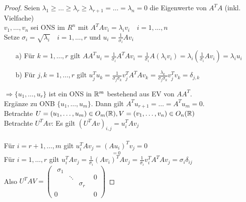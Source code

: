 \begin{proof}
	Seien $\lambda_1 \ge \ldots \ge \lambda_r\ge\lambda_{r+1}=\ldots=\lambda_n=0$ die Eigenwerte von $A^TA$ (inkl. Vielfache)\\
	$v_1,\ldots,v_n$ sei ONS im $R^n$ mit $A^TAv_i=\lambda_iv_i \quad i=1,\ldots,n$\\
	Setze $\sigma_i =\sqrt{\lambda_i} \quad i=1,\ldots,r \text{ und } u_i=\frac{1}{\sigma_i}Av_i$\\
	\begin{itemize}
		\item[a)]Für $k=1,\ldots,r$ gilt $AA^Tu_i=\frac{1}{\sigma_i}A^TAv_i=\frac{1}{\sigma_i}A(\lambda_iv_i)=\lambda_i\left(\frac{1}{\sigma_i}Av_i\right)=\lambda_iu_i$
		\item[b)]Für $j,k=1,\ldots,r$ gilt $u_j^{T}u_k=\frac{1}{\sigma_j\sigma_k}v_j^{T}A^TAv_k=\frac{\lambda_k}{\sigma_j\sigma_k}v_j^{T}v_k=\delta_{j,k}$
	\end{itemize}
	$\Rightarrow \{u_1,\ldots,u_r\}$ ist ein ONS in $\mathbb R^m$ bestehend aus EV von $AA^T$.\\\newline
	Ergänze zu ONB $\{u_1,\ldots,u_m\}$. Dann gilt $A^Tu_{r+1}=\ldots=A^Tu_m=0$.\\
	Betrachte $U=(u_1,\ldots,u_m) \in O_m(\mathbb R), V=(v_1,\ldots,v_n) \in O_n(\mathbb R)$\\
	Betrachte $U^TAv$: Es gilt $(U^TAv)_{i,j}=u_i^{T}Av_j$\\\\
	Für $i=r+1,\ldots,m$ gilt $u_i^{T}Av_j=\underset{=0}{(Au_i)^T}v_j=0$\\
	Für $i=1,\ldots,r $ gilt $u_i^{T}Av_j=\frac{1}{\sigma_i}(Av_i)^TAv_j=\frac{1}{\sigma_i}v_i^{T}A^TAv_j=\sigma_i\delta_{ij}$\\\newline
	Also $U^TAV= \left(\begin{array}{c|c}
		\begin{matrix}\sigma_1 & &  \\&\ddots & \\ & & \sigma_r\end{matrix} &0\\\hline
		0 & 0
		\end{array}\right)$
\end{proof}